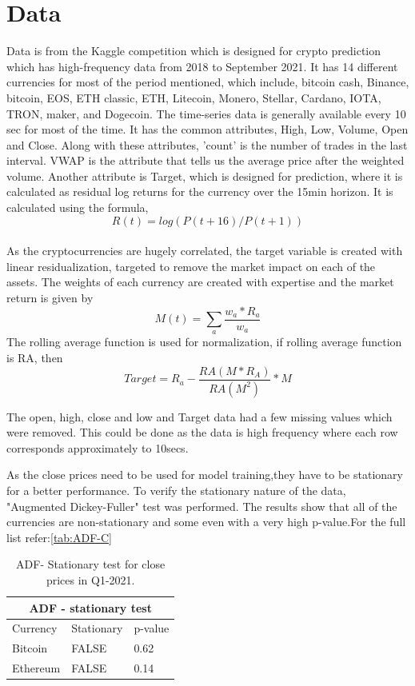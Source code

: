\documentclass[final]{cvpr}
\begin{document}
\section{Data}

Data is from the Kaggle competition which is designed for crypto prediction which has high-frequency data from 2018 to September 2021. It has 14 different currencies for most of the period mentioned, which include, bitcoin cash, Binance, bitcoin, EOS, ETH classic, ETH, Litecoin, Monero, Stellar, Cardano, IOTA, TRON, maker, and Dogecoin. The time-series data is generally available every 10 sec for most of the time. It has the common attributes, High, Low, Volume, Open and Close. Along with these attributes, 'count' is the number of trades in the last interval. VWAP is the attribute that tells us the average price after the weighted volume. Another attribute is Target, which is designed for prediction, where it is calculated as residual log returns for the currency over the 15min horizon. It is calculated using the formula, $$R(t) = log(P(t+16)/P(t+1))$$
\\
As the cryptocurrencies are hugely correlated, the target variable is created with linear residualization, targeted to remove the market impact on each of the assets. The weights of each currency are created with expertise and the market return is given by  $$M(t) = \sum_a \frac{w_a * R_a}{w_a}$$
The rolling average function is used for normalization, if rolling average function is RA, then
$$Target = R_a - \frac{RA(M*R_A)}{RA(M^2)}*M$$

The open, high, close and low and Target data had a few missing values which were removed. This could be done as the data is high frequency where each row corresponds approximately to 10secs. 

As the close prices need to be used for model training,they have to be stationary for a better performance. To verify the stationary nature of the data, "Augmented Dickey-Fuller" test was performed. The results show that all of the currencies are non-stationary and some even with a very high p-value.For the full list refer:\ref{tab:ADF-C}

\begin{table}[h!]
\centering
 \begin{tabular}{ |p{2.5cm}|p{1.5cm}|p{1.5cm}|}
 \hline
 \multicolumn{3}{|c|}{\textbf{ADF - stationary test}} \\
 \hline
 Currency & Stationary & p-value \\
 \hline
 Bitcoin  & FALSE & 0.62 \\
 \hline
 Ethereum  & FALSE & 0.14 \\
 \hline
  \end{tabular}
  \caption{ADF- Stationary test for close prices in Q1-2021.}
 \label{tab:ADF}
\end{table}
\end{document}
